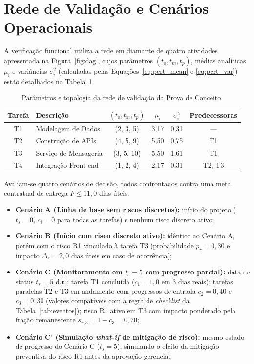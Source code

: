 \documentclass[12pt,openany,oneside,a4paper,english,brazilian,sumario=tradicional]{abntex2}
\newcommand{\fonteautores}{\par\vspace{1mm}{\small Fonte: Elaborado pelos autores (2026).}}
\begin{document}
\section{Rede de Validação e Cenários Operacionais}\label{sec:poc_cenarios}

A verificação funcional utiliza a rede em diamante de quatro atividades apresentada na Figura~\ref{fig:dag}, cujos parâmetros $(t_o, t_m, t_p)$, médias analíticas $\mu_i$ e variâncias $\sigma_i^2$ (calculadas pelas Equações~\ref{eq:pert_mean} e \ref{eq:pert_var}) estão detalhados na Tabela~\ref{tab:rede}.

\begin{table}[htbp]
\caption{Parâmetros e topologia da rede de validação da Prova de Conceito.}\label{tab:rede}
\footnotesize
\begin{tabularx}{\textwidth}{c X c c c c}
\toprule
\textbf{Tarefa} & \textbf{Descrição} & $(t_o,t_m,t_p)$ & $\mu_i$ & $\sigma_i^2$ & \textbf{Predecessoras}\\
\midrule
T1 & Modelagem de Dados & (2, 3, 5) & 3,17 & 0,31 & ---\\
T2 & Construção de APIs & (4, 5, 9) & 5,50 & 0,75 & T1\\
T3 & Serviço de Mensageria & (3, 5, 10) & 5,50 & 1,61 & T1\\
T4 & Integração Front-end & (1, 2, 4) & 2,17 & 0,31 & T2, T3\\
\bottomrule
\end{tabularx}
\fonteautores
\end{table}

Avaliam-se quatro cenários de decisão, todos confrontados contra uma meta contratual de entrega $F \le 11{,}0$ dias úteis:
\begin{itemize}
  \item \textbf{Cenário A (Linha de base sem riscos discretos):} início do projeto ($t_s=0$, $c_i=0$ para todas as tarefas) e nenhum risco discreto ativo;
  \item \textbf{Cenário B (Início com risco discreto ativo):} idêntico ao Cenário A, porém com o risco R1 vinculado à tarefa T3 (probabilidade $p_r=0{,}30$ e impacto $\Delta_r=2{,}0$ dias úteis em caso de ocorrência);
  \item \textbf{Cenário C (Monitoramento em $t_s=5$ com progresso parcial):} data de status $t_s=5$ d.u.; tarefa T1 concluída ($c_1=1{,}0$ em 3 dias reais); tarefas paralelas T2 e T3 em andamento com progressos de entrada $c_2=0{,}40$ e $c_3=0{,}30$ (valores compatíveis com a regra de \textit{checklist} da Tabela~\ref{tab:eventos}); risco R1 ativo em T3 com impacto ponderado pela fração remanescente $s_{r,3}=1-c_3=0{,}70$;
  \item \textbf{Cenário C$'$ (Simulação \textit{what-if} de mitigação de risco):} mesmo estado de progresso do Cenário C ($t_s=5$), simulando o efeito da mitigação preventiva do risco R1 antes da aprovação gerencial.
\end{itemize}
\end{document}
